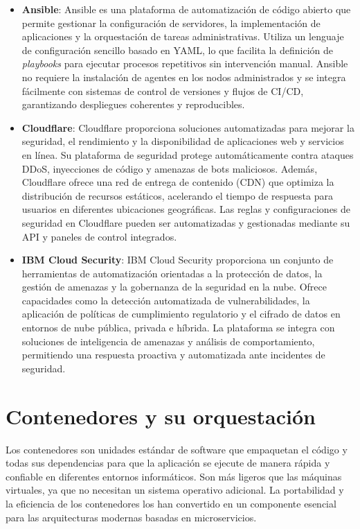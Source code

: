 {\begin{itemize}
                \item \textbf{Ansible}: Ansible es una plataforma de automatización de código abierto que permite gestionar la configuración de servidores, la implementación de aplicaciones y la orquestación de tareas administrativas. Utiliza un lenguaje de configuración sencillo basado en YAML, lo que facilita la definición de \textit{playbooks} para ejecutar procesos repetitivos sin intervención manual. Ansible no requiere la instalación de agentes en los nodos administrados y se integra fácilmente con sistemas de control de versiones y flujos de CI/CD, garantizando despliegues coherentes y reproducibles.
                \item \textbf{Cloudflare}: Cloudflare proporciona soluciones automatizadas para mejorar la seguridad, el rendimiento y la disponibilidad de aplicaciones web y servicios en línea. Su plataforma de seguridad protege automáticamente contra ataques DDoS, inyecciones de código y amenazas de bots maliciosos. Además, Cloudflare ofrece una red de entrega de contenido (CDN) que optimiza la distribución de recursos estáticos, acelerando el tiempo de respuesta para usuarios en diferentes ubicaciones geográficas. Las reglas y configuraciones de seguridad en Cloudflare pueden ser automatizadas y gestionadas mediante su API y paneles de control integrados.            
                \item \textbf{IBM Cloud Security}: IBM Cloud Security proporciona un conjunto de herramientas de automatización orientadas a la protección de datos, la gestión de amenazas y la gobernanza de la seguridad en la nube. Ofrece capacidades como la detección automatizada de vulnerabilidades, la aplicación de políticas de cumplimiento regulatorio y el cifrado de datos en entornos de nube pública, privada e híbrida. La plataforma se integra con soluciones de inteligencia de amenazas y análisis de comportamiento, permitiendo una respuesta proactiva y automatizada ante incidentes de seguridad.
            \end{itemize}
            
    \section{Contenedores y su orquestación}
        Los contenedores son unidades estándar de software que empaquetan el código y todas sus dependencias para que la aplicación se ejecute de manera rápida y confiable en diferentes entornos informáticos. Son más ligeros que las máquinas virtuales, ya que no necesitan un sistema operativo adicional. La portabilidad y la eficiencia de los contenedores los han convertido en un componente esencial para las arquitecturas modernas basadas en microservicios.
        
}
